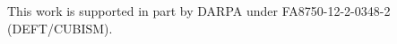 \documentclass[remotesensing,article,accept,moreauthors,pdftex,12pt,a4paper]{mdpi}
\begin{document}


This work is supported in part by DARPA under
FA8750-12-2-0348-2 (DEFT/CUBISM).









\end{document}
